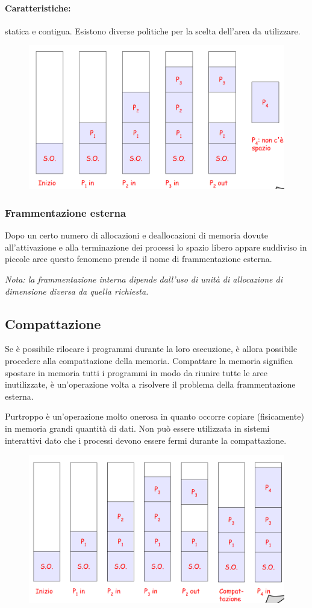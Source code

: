 \paragraph{Caratteristiche:} statica e contigua. Esistono diverse politiche per la scelta dell'area da utilizzare.
\begin{figure} [h]
    \centering
    \includegraphics[width=0.6\linewidth]{Images/Screenshot 2025-01-16 at 19-10-01 so-05-memoria - so-05-memoria.pdf.png}
\end{figure}


\subsubsection{Frammentazione esterna}
Dopo un certo numero di allocazioni e deallocazioni di memoria dovute all'attivazione e alla terminazione dei processi lo spazio libero appare suddiviso in piccole aree questo fenomeno prende il nome di frammentazione esterna.

\textit{Nota: la frammentazione interna dipende dall'uso di unità di allocazione di dimensione diversa da quella richiesta.}


\subsection{Compattazione}
Se è possibile rilocare i programmi durante la loro esecuzione,
è allora possibile procedere alla compattazione della memoria.
Compattare la memoria significa spostare in memoria tutti i programmi in modo da riunire tutte le aree inutilizzate, è un’operazione volta a risolvere il problema della frammentazione esterna. 

Purtroppo è un’operazione molto onerosa in quanto occorre copiare (fisicamente) in memoria grandi quantità di dati.
Non può essere utilizzata in sistemi interattivi dato che i processi devono essere fermi durante la compattazione.

\begin{figure} [h]
    \centering
    \includegraphics[width=0.6\linewidth]{Images/Screenshot 2025-01-16 at 19-21-10 so-05-memoria - so-05-memoria.pdf.png}
\end{figure}


